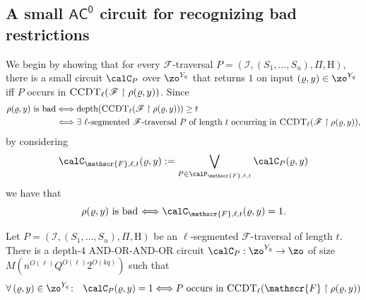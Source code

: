 \documentclass{toc}
\theoremstyle{plain}
\newcommand{\acz}{\mathsf{AC^0}}
\newcommand{\uhr}{\upharpoonright}
\newcommand{\CCDT}{\textsc{CCDT}}
\newcommand{\depth}{\mathrm{depth}}
\begin{document}
\subsection{A small $\acz$ circuit for recognizing bad restrictions} \label{sec:small-acz-bad}

We begin by showing that for every $\mathscr{F}$-traversal $P = (\mathscr{I}, (S_1,\ldots,S_u), \Pi,{\mathrm{H}})$, there is a small circuit $\calC_P$ over $\zo^{Y_q}$ that returns $1$ on input $(\varrho,y)\in \zo^{Y_q}$ iff $P$ occurs in $\CCDT_\ell(\mathscr{F}\uhr \rho(\varrho,y))$.  Since
\begin{align*}
\text{$\rho(\varrho,y)$ is bad} &\Longleftrightarrow \depth(\CCDT_\ell(\mathscr{F} \uhr \rho(\varrho,y))) \ge t \\
&\Longleftrightarrow \text{$\exists$ $\ell$-segmented $\mathscr{F}$-traversal $P$ of length $t$ occurring in $\CCDT_\ell(\mathscr{F}\uhr\rho(\varrho,y))$},
\end{align*}
by considering  
\begin{equation}
   \calC_{\mathscr{F},\ell,t}(\varrho,y) := \bigvee_{P\in\calP_{\mathscr{F},\ell,t}} \calC_P(\varrho,y) \label{eq:big-or} 
   \end{equation} 
we have that 
\[ \text{$\rho(\varrho,y)$ is bad $\Longleftrightarrow \calC_{\mathscr{F},\ell,t}(\varrho,y) = 1$.}
 \] 
\begin{claim}
\label{claim:subcircuit} 
Let $P = (\mathscr{I}, (S_1,\ldots,S_{u}), \Pi, {\mathrm{H}})$ be an $\ell$-segmented $\mathscr{F}$-traversal of length $t$. There is a depth-$4$ AND-OR-AND-OR circuit $\calC_P : \zo^{Y_q} \to \zo$ of size $M(n^{O(\ell)} Q^{O(\ell)}2^{O(kq)})$ such that
\[ \forall\,(\varrho,y)\in \zo^{Y_q}\colon\ \ \calC_P(\varrho,y) =1 \Longleftrightarrow \text{$P$ occurs in $\CCDT_\ell(\mathscr{F}\uhr\rho(\varrho,y))$} \] 
\end{claim} 
\end{document}

